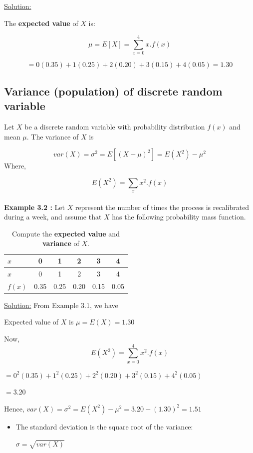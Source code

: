 \documentclass[
  11pt,
  letterpaper,
  DIV=11,
  numbers=noendperiod]{scrreprt}
\begin{document}
\ul{Solution:}

The \textbf{expected value} of \(X\) is:

\[\mu =E[X]=\sum_{x=0}^4 x.f(x) \]

\[=0(0.35)+1(0.25)+2(0.20)+3(0.15)+4(0.05)=1.30\]

\subsection{Variance (population) of discrete random
variable}\label{variance-population-of-discrete-random-variable}

Let \(X\) be a discrete random variable with probability distribution
\(f(x)\) and mean \(\mu\). The variance of \(X\) is

\[var(X)=\sigma^2 =E[(X-\mu)^2]=E(X^2)-\mu^2\] Where,

\[E(X^2)=\sum_{x} x^2.f(x)\]\\

\textbf{Example 3.2 :} Let \(X\) represent the number of times the
process is recalibrated during a week, and assume that \(X\) has the
following probability mass function.

\begin{longtable}[]{@{}lccccc@{}}
\caption{Compute the \textbf{expected value} and \textbf{variance} of
\(X\).}\tabularnewline
\toprule\noalign{}
\(x\) & 0 & 1 & 2 & 3 & 4 \\
\midrule\noalign{}
\endfirsthead
\toprule\noalign{}
\(x\) & 0 & 1 & 2 & 3 & 4 \\
\midrule\noalign{}
\endhead
\bottomrule\noalign{}
\endlastfoot
\(f(x)\) & 0.35 & 0.25 & 0.20 & 0.15 & 0.05 \\
\end{longtable}

\ul{Solution:} From Example 3.1, we have

Expected value of \(X\) is \(\mu =E(X)=1.30\)

Now, \[E(X^2)=\sum_{x=0}^4 x^2.f(x)\]

\(=0^2(0.35)+1^2 (0.25)+2^2 (0.20)+3^2 (0.15)+4^2 (0.05)\)

\(=3.20\)

Hence, \(var(X)=\sigma^2 =E(X^2)-\mu^2=3.20-(1.30)^2=1.51\)

\begin{itemize}
\item
  The standard deviation is the square root of the variance:

  \(\sigma=\sqrt {var(X)}\)
\end{itemize}
\end{document}
